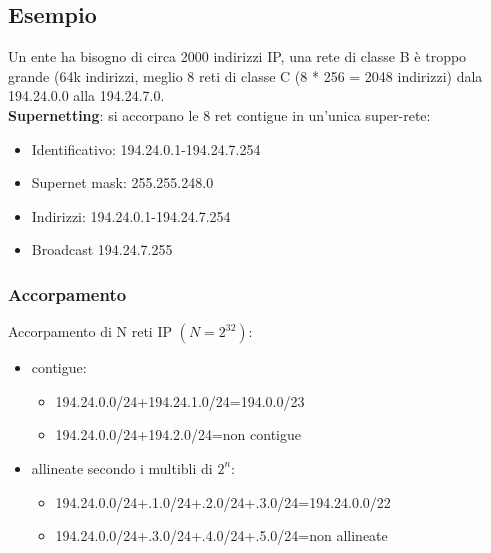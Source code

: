 \documentclass{report}
\begin{document}
                    \subsection{Esempio}
                        Un ente ha bisogno di circa 2000 indirizzi IP, una rete di classe B è troppo grande (64k indirizzi, meglio 8 reti di classe C (8 * 256 = 2048 indirizzi) dala 194.24.0.0 alla 194.24.7.0.
                        \\
                        \textbf{Supernetting}: si accorpano le 8 ret contigue in un'unica super-rete: 
                        \begin{itemize}
                            \item Identificativo: 194.24.0.1-194.24.7.254
                            \item Supernet mask: 255.255.248.0
                            \item Indirizzi: 194.24.0.1-194.24.7.254
                            \item Broadcast 194.24.7.255
                        \end{itemize}
                        \subsubsection{Accorpamento}
                            Accorpamento di N reti IP $(N=2^{32})$:
                            \begin{itemize}
                                \item contigue: 
                                \begin{itemize}
                                    \item 194.24.0.0/24+194.24.1.0/24=194.0.0/23
                                    \item 194.24.0.0/24+194.2.0/24=non contigue
                                \end{itemize}
                                \item allineate secondo i multibli di $2^n$: 
                                    \begin{itemize}
                                    \item 194.24.0.0/24+.1.0/24+.2.0/24+.3.0/24=194.24.0.0/22
                                    \item 194.24.0.0/24+.3.0/24+.4.0/24+.5.0/24=non allineate
                                \end{itemize}
                            \end{itemize}
\end{document}
